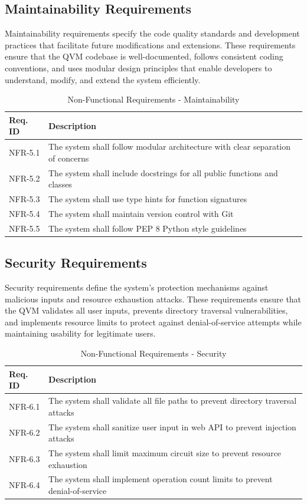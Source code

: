 \subsection{Maintainability Requirements}

Maintainability requirements specify the code quality standards and development practices that facilitate future modifications and extensions. These requirements ensure that the QVM codebase is well-documented, follows consistent coding conventions, and uses modular design principles that enable developers to understand, modify, and extend the system efficiently.

\begin{table}[H]
\centering
\caption{Non-Functional Requirements - Maintainability}
\begin{tabular}{|p{2cm}|p{11cm}|}
\hline
\textbf{Req. ID} & \textbf{Description} \\
\hline
NFR-5.1 & The system shall follow modular architecture with clear separation of concerns \\
\hline
NFR-5.2 & The system shall include docstrings for all public functions and classes \\
\hline
NFR-5.3 & The system shall use type hints for function signatures \\
\hline
NFR-5.4 & The system shall maintain version control with Git \\
\hline
NFR-5.5 & The system shall follow PEP 8 Python style guidelines \\
\hline
\end{tabular}
\end{table}

\subsection{Security Requirements}

Security requirements define the system's protection mechanisms against malicious inputs and resource exhaustion attacks. These requirements ensure that the QVM validates all user inputs, prevents directory traversal vulnerabilities, and implements resource limits to protect against denial-of-service attempts while maintaining usability for legitimate users.

\begin{table}[H]
\centering
\caption{Non-Functional Requirements - Security}
\begin{tabular}{|p{2cm}|p{11cm}|}
\hline
\textbf{Req. ID} & \textbf{Description} \\
\hline
NFR-6.1 & The system shall validate all file paths to prevent directory traversal attacks \\
\hline
NFR-6.2 & The system shall sanitize user input in web API to prevent injection attacks \\
\hline
NFR-6.3 & The system shall limit maximum circuit size to prevent resource exhaustion \\
\hline
NFR-6.4 & The system shall implement operation count limits to prevent denial-of-service \\
\hline
\end{tabular}
\end{table}
\FloatBarrier

